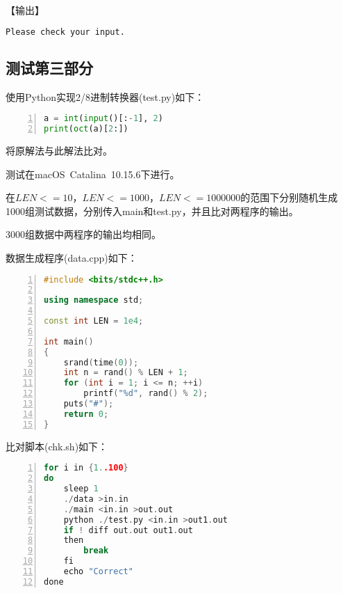 \documentclass{article}
\begin{document}
【输出】

\begin{lstlisting}[language={bash},
    basicstyle=\small\consolas]
Please check your input.
\end{lstlisting}

\subsection{测试第三部分}

使用Python实现2/8进制转换器(test.py)如下：

\begin{lstlisting}[language={Python},
    numbers=left,
    numberstyle=\tiny\consolas,
    basicstyle=\small\consolas]
a = int(input()[:-1], 2)
print(oct(a)[2:])
\end{lstlisting}

将原解法与此解法比对。

测试在macOS\ Catalina\ 10.15.6下进行。

在$LEN<=10$，$LEN<=1000$，$LEN<=1000000$的范围下分别随机生成1000组测试数据，分别传入main和test.py，并且比对两程序的输出。

3000组数据中两程序的输出均相同。

数据生成程序(data.cpp)如下：

\begin{lstlisting}[language={C++},
    numbers=left,
    numberstyle=\tiny\consolas,
    basicstyle=\small\consolas]
#include <bits/stdc++.h>

using namespace std;

const int LEN = 1e4;

int main()
{
    srand(time(0));
    int n = rand() % LEN + 1;
    for (int i = 1; i <= n; ++i)
        printf("%d", rand() % 2);
    puts("#");
    return 0;
}
\end{lstlisting}

比对脚本(chk.sh)如下：

\begin{lstlisting}[language={C++},
    numbers=left,
    numberstyle=\tiny\consolas,
    basicstyle=\small\consolas]
for i in {1..100}
do
    sleep 1
    ./data >in.in
    ./main <in.in >out.out
    python ./test.py <in.in >out1.out
    if ! diff out.out out1.out
    then
        break
    fi
    echo "Correct"
done
\end{lstlisting}
\end{document}
